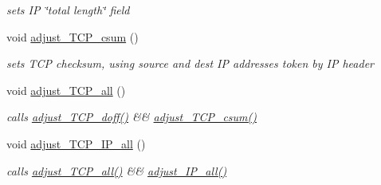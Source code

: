 \begin{CompactItemize}
\begin{CompactList}\small\item\em sets IP \char`\"{}total length\char`\"{} field \item\end{CompactList}\item 
\hypertarget{classsocketpp_1_1TCP__IP__RawSocket_c203b188308532333bdf53a4e18bc230}{
void \hyperlink{classsocketpp_1_1TCP__IP__RawSocket_c203b188308532333bdf53a4e18bc230}{adjust\_\-TCP\_\-csum} ()}
\label{classsocketpp_1_1TCP__IP__RawSocket_c203b188308532333bdf53a4e18bc230}

\begin{CompactList}\small\item\em sets TCP checksum, using source and dest IP addresses token by IP header \item\end{CompactList}\item 
\hypertarget{classsocketpp_1_1TCP__IP__RawSocket_3644327ff72d322ff809ac432f59783b}{
void \hyperlink{classsocketpp_1_1TCP__IP__RawSocket_3644327ff72d322ff809ac432f59783b}{adjust\_\-TCP\_\-all} ()}
\label{classsocketpp_1_1TCP__IP__RawSocket_3644327ff72d322ff809ac432f59783b}

\begin{CompactList}\small\item\em calls \hyperlink{classsocketpp_1_1TCP__RawSocket_029eb8bfbf19531253edf046775d9f5f}{adjust\_\-TCP\_\-doff()} \&\& \hyperlink{classsocketpp_1_1TCP__IP__RawSocket_c203b188308532333bdf53a4e18bc230}{adjust\_\-TCP\_\-csum()} \item\end{CompactList}\item 
\hypertarget{classsocketpp_1_1TCP__IP__RawSocket_dd3b21314f1768962bf399291f406768}{
void \hyperlink{classsocketpp_1_1TCP__IP__RawSocket_dd3b21314f1768962bf399291f406768}{adjust\_\-TCP\_\-IP\_\-all} ()}
\label{classsocketpp_1_1TCP__IP__RawSocket_dd3b21314f1768962bf399291f406768}

\begin{CompactList}\small\item\em calls \hyperlink{classsocketpp_1_1TCP__IP__RawSocket_3644327ff72d322ff809ac432f59783b}{adjust\_\-TCP\_\-all()} \&\& \hyperlink{classsocketpp_1_1IP__RawSocket_45e60510233daaa2f279d3a4706fdce5}{adjust\_\-IP\_\-all()} \item\end{CompactList}\end{CompactItemize}

